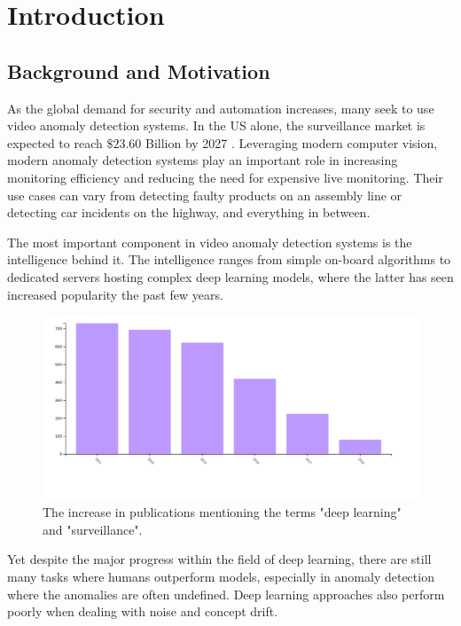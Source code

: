 \chapter{Introduction}
\section{Background and Motivation}
As the global demand for security and automation increases, many seek to use video anomaly detection systems. In the US alone, the surveillance market is expected to reach $\$23.60$ Billion by 2027 \cite{us_video_stats}. Leveraging modern computer vision, modern anomaly detection systems play an important role in increasing monitoring efficiency and reducing the need for expensive live monitoring. Their use cases can vary from detecting faulty products on an assembly line or detecting car incidents on the highway, and everything in between.
\par
The most important component in video anomaly detection systems is the intelligence behind it. The intelligence ranges from simple on-board algorithms to dedicated servers hosting complex deep learning models, where the latter has seen increased popularity the past few years.\par
\begin{figure}[H]
    \centering
    \includegraphics[width=\linewidth]{resources/introduction/deep_learning_surveillance_chart.jpg}
    \caption{The increase in publications mentioning the terms "deep learning" and "surveillance". \cite{deep_learning_surveillance_stats}}
\end{figure}
Yet despite the major progress within the field of deep learning, there are still many tasks where humans outperform models, especially in anomaly detection where the anomalies are often undefined. Deep learning approaches also perform poorly when dealing with noise and concept drift.
\par
